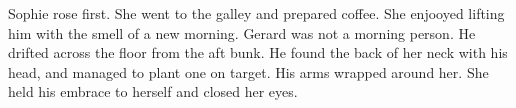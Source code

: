 

Sophie rose first.  She went to the galley and prepared coffee.  She
enjooyed lifting him with the smell of a new morning.  Gerard was not
a morning person.  He drifted across the floor from the aft bunk.  He
found the back of her neck with his head, and managed to plant one on
target.  His arms wrapped around her.  She held his embrace to herself
and closed her eyes.



\bye
